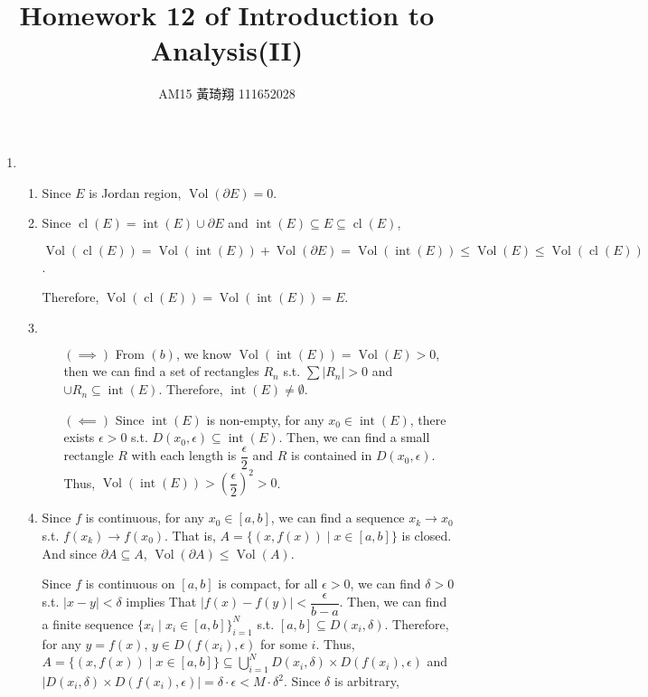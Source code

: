 \documentclass[12pt]{article}
\title{Homework 12 of Introduction to Analysis(II)}
\author{AM15 黃琦翔 111652028}
\DeclareMathOperator{\volumn}{Vol}
\DeclareMathOperator{\interior}{int}
\DeclareMathOperator{\closure}{cl}
\begin{document}
\maketitle
\begin{enumerate}
    \item \begin{enumerate}
        \item Since $E$ is Jordan region, $\volumn(\partial E) = 0$.

        \item Since $\closure(E) = \interior(E) \cup \partial E$ and $\interior(E)\subseteq E \subseteq \closure(E)$,

        $\volumn(\closure(E)) = \volumn(\interior(E)) + \volumn(\partial E) = \volumn(\interior(E))\leq \volumn(E) \leq \volumn(\closure(E))$.

        Therefore, $\volumn(\closure(E)) = \volumn(\interior(E)) = E$.

        \item $\ $
        \begin{enumerate}
            \item[$(\implies)$] From $(b)$, we know $\volumn(\interior(E)) = \volumn(E) > 0$, 
            then we can find a set of rectangles $R_n$ s.t. $\sum |R_n| > 0$ and $\cup R_n \subseteq \interior(E)$.
            Therefore, $\interior(E) \neq \emptyset$.

            \item[$(\impliedby)$] Since $\interior(E)$ is non-empty, for any $x_0\in \interior(E)$, there exists $\epsilon > 0$ s.t. $D(x_0, \epsilon) \subseteq \interior(E)$.
            Then, we can find a small rectangle $R$ with each length is $\dfrac{\epsilon}{2}$ and $R$ is contained in $D(x_0, \epsilon)$.
            Thus, $\volumn(\interior(E)) > \left(\dfrac{\epsilon}{2}\right)^2 > 0$.
        \end{enumerate}

        \item Since $f$ is continuous, for any $x_0 \in [a, b]$, we can find a sequence $x_k \to x_0$ s.t. $f(x_k) \to f(x_0)$.
        That is, $A = \{(x, f(x)) \mid x\in [a, b]\}$ is closed.
        And since $\partial A \subseteq A$, $\volumn(\partial A) \leq \volumn(A)$.
        
        Since $f$ is continuous on $[a, b]$ is compact, for all $\epsilon > 0$, we can find $\delta > 0$ s.t. $|x-y| < \delta$ implies That $|f(x) - f(y)| < \dfrac{\epsilon}{b-a}$.
        Then, we can find a finite sequence $\{x_i \mid x_i \in [a, b]\}_{i=1}^N$ s.t. $[a, b] \subseteq D(x_i, \delta)$.
        Therefore, for any $y = f(x)$, $y \in D(f(x_i), \epsilon)$ for some $i$.
        Thus, $A = \{(x, f(x)) \mid x\in [a, b]\} \subseteq \displaystyle\bigcup_{i=1}^N D(x_i, \delta)\times D(f(x_i), \epsilon)$ and $|D(x_i, \delta) \times D(f(x_i), \epsilon)| = \delta \cdot \epsilon < M\cdot \delta^2$.
        Since $\delta$ is arbitrary, 
    \end{enumerate}
\end{enumerate}
\end{document}
